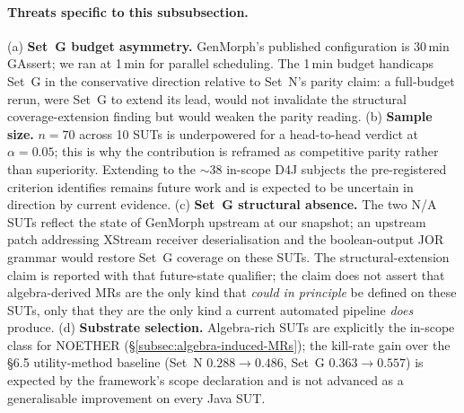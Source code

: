 \paragraph{Threats specific to this subsubsection.}
(a) \textbf{Set~G budget asymmetry.} GenMorph's published
configuration is 30\,min GAssert; we ran at 1\,min for parallel
scheduling. The 1\,min budget handicaps Set~G in the conservative
direction relative to Set~N's parity claim: a full-budget rerun, were
Set~G to extend its lead, would not invalidate the structural
coverage-extension finding but would weaken the parity reading.
(b) \textbf{Sample size.} $n = 70$ across 10 SUTs is underpowered for
a head-to-head verdict at $\alpha = 0.05$; this is why the
contribution is reframed as competitive parity rather than
superiority. Extending to the $\sim 38$ in-scope D4J subjects the
pre-registered criterion identifies remains future work and is
expected to be uncertain in direction by current evidence.
(c) \textbf{Set~G structural absence.} The two N/A SUTs reflect the
state of GenMorph upstream at our snapshot; an upstream patch
addressing XStream receiver deserialisation and the boolean-output
JOR grammar would restore Set~G coverage on these SUTs. The
structural-extension claim is reported with that future-state
qualifier; the claim does not assert that algebra-derived MRs are the
only kind that \emph{could in principle} be defined on these SUTs,
only that they are the only kind a current automated pipeline
\emph{does} produce.
(d) \textbf{Substrate selection.} Algebra-rich SUTs are explicitly
the in-scope class for NOETHER (\S\ref{subsec:algebra-induced-MRs});
the kill-rate gain over the §6.5 utility-method baseline (Set~N
$0.288 \rightarrow 0.486$, Set~G $0.363 \rightarrow 0.557$) is
expected by the framework's scope declaration and is not advanced as
a generalisable improvement on every Java SUT.

